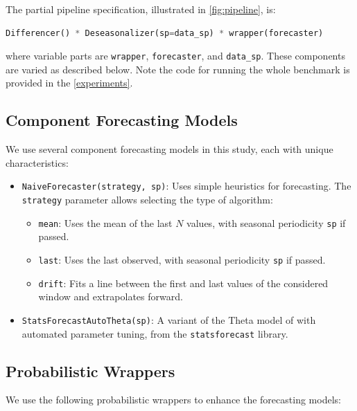 The partial pipeline specification, illustrated in \autoref{fig:pipeline}, is:

\begin{lstlisting}[language=Python]
Differencer() * Deseasonalizer(sp=data_sp) * wrapper(forecaster)
\end{lstlisting}

where variable parts are \texttt{wrapper}, \texttt{forecaster}, and \texttt{data\_sp}. These components are varied as described below.
Note the code for running the whole benchmark is provided in the \autoref{experiments}.

\subsection{Component Forecasting Models}

We use several component forecasting models in this study, each with unique characteristics:

\begin{itemize}
    \item \texttt{NaiveForecaster(strategy, sp)}: Uses simple heuristics for forecasting. The \texttt{strategy} parameter allows selecting the type of algorithm:
    \begin{itemize}
        \item \texttt{mean}: Uses the mean of the last \(N\) values, with seasonal periodicity \texttt{sp} if passed.
        \item \texttt{last}: Uses the last observed, with seasonal periodicity \texttt{sp} if passed.
        \item \texttt{drift}: Fits a line between the first and last values of the considered window and extrapolates forward.
    \end{itemize}

    \item \texttt{StatsForecastAutoTheta(sp)}: A variant of the Theta model of \cite{Assimakopoulos2000} with automated parameter tuning, from the \texttt{statsforecast} library.

\end{itemize}

\subsection{Probabilistic Wrappers}
We use the following probabilistic wrappers to enhance the forecasting models:

